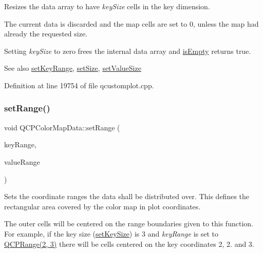 Resizes the data array to have {\itshape key\+Size} cells in the key dimension.

The current data is discarded and the map cells are set to 0, unless the map had already the requested size.

Setting {\itshape key\+Size} to zero frees the internal data array and \hyperlink{class_q_c_p_color_map_data_aea88cc75a76ca571acf29b2ba8ac970d}{is\+Empty} returns true.

\begin{DoxySeeAlso}{See also}
\hyperlink{class_q_c_p_color_map_data_a0738c485f3c9df9ea1241b7a8bb6a86e}{set\+Key\+Range}, \hyperlink{class_q_c_p_color_map_data_a0d9ff35c299d0478b682bfbcdd9c097e}{set\+Size}, \hyperlink{class_q_c_p_color_map_data_a0893c9e3914513048b45e3429ffd16f2}{set\+Value\+Size} 
\end{DoxySeeAlso}


Definition at line 19754 of file qcustomplot.\+cpp.

\mbox{\label{class_q_c_p_color_map_data_aad9c1c7c703c1339489fc730517c83d4}} 
\subsubsection{\texorpdfstring{set\+Range()}{setRange()}}
{\footnotesize\ttfamily void Q\+C\+P\+Color\+Map\+Data\+::set\+Range (\begin{DoxyParamCaption}\item[{const \hyperlink{class_q_c_p_range}{Q\+C\+P\+Range} \&}]{key\+Range,  }\item[{const \hyperlink{class_q_c_p_range}{Q\+C\+P\+Range} \&}]{value\+Range }\end{DoxyParamCaption})}

Sets the coordinate ranges the data shall be distributed over. This defines the rectangular area covered by the color map in plot coordinates.

The outer cells will be centered on the range boundaries given to this function. For example, if the key size (\hyperlink{class_q_c_p_color_map_data_ac7ef70e383aface34b44dbde49234b6b}{set\+Key\+Size}) is 3 and {\itshape key\+Range} is set to {\ttfamily \hyperlink{class_q_c_p_range}{Q\+C\+P\+Range(2, 3)}} there will be cells centered on the key coordinates 2, 2. and 3.

